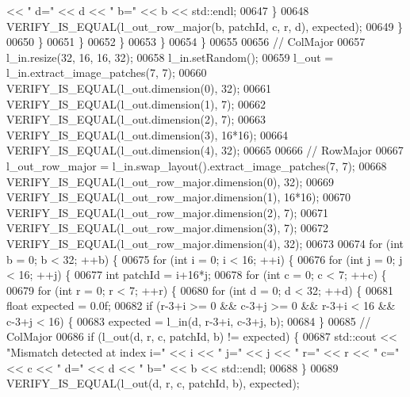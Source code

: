 \begin{DoxyCode}
       << \textcolor{stringliteral}{" d="} << d << \textcolor{stringliteral}{" b="} << b << std::endl;
00647               \}
00648               VERIFY\_IS\_EQUAL(l\_out\_row\_major(b, patchId, c, r, d), expected);
00649             \}
00650           \}
00651         \}
00652       \}
00653     \}
00654   \}
00655 
00656   \textcolor{comment}{// ColMajor}
00657   l\_in.resize(32, 16, 16, 32);
00658   l\_in.setRandom();
00659   l\_out = l\_in.extract\_image\_patches(7, 7);
00660   VERIFY\_IS\_EQUAL(l\_out.dimension(0), 32);
00661   VERIFY\_IS\_EQUAL(l\_out.dimension(1), 7);
00662   VERIFY\_IS\_EQUAL(l\_out.dimension(2), 7);
00663   VERIFY\_IS\_EQUAL(l\_out.dimension(3), 16*16);
00664   VERIFY\_IS\_EQUAL(l\_out.dimension(4), 32);
00665 
00666   \textcolor{comment}{// RowMajor}
00667   l\_out\_row\_major = l\_in.swap\_layout().extract\_image\_patches(7, 7);
00668   VERIFY\_IS\_EQUAL(l\_out\_row\_major.dimension(0), 32);
00669   VERIFY\_IS\_EQUAL(l\_out\_row\_major.dimension(1), 16*16);
00670   VERIFY\_IS\_EQUAL(l\_out\_row\_major.dimension(2), 7);
00671   VERIFY\_IS\_EQUAL(l\_out\_row\_major.dimension(3), 7);
00672   VERIFY\_IS\_EQUAL(l\_out\_row\_major.dimension(4), 32);
00673 
00674   \textcolor{keywordflow}{for} (\textcolor{keywordtype}{int} b = 0; b < 32; ++b) \{
00675     \textcolor{keywordflow}{for} (\textcolor{keywordtype}{int} i = 0; i < 16; ++i) \{
00676       \textcolor{keywordflow}{for} (\textcolor{keywordtype}{int} j = 0; j < 16; ++j) \{
00677         \textcolor{keywordtype}{int} patchId = i+16*j;
00678         \textcolor{keywordflow}{for} (\textcolor{keywordtype}{int} c = 0; c < 7; ++c) \{
00679           \textcolor{keywordflow}{for} (\textcolor{keywordtype}{int} r = 0; r < 7; ++r) \{
00680             \textcolor{keywordflow}{for} (\textcolor{keywordtype}{int} d = 0; d < 32; ++d) \{
00681               \textcolor{keywordtype}{float} expected = 0.0f;
00682               \textcolor{keywordflow}{if} (r-3+i >= 0 && c-3+j >= 0 && r-3+i < 16 && c-3+j < 16) \{
00683                 expected = l\_in(d, r-3+i, c-3+j, b);
00684               \}
00685               \textcolor{comment}{// ColMajor}
00686               \textcolor{keywordflow}{if} (l\_out(d, r, c, patchId, b) != expected) \{
00687                 std::cout << \textcolor{stringliteral}{"Mismatch detected at index i="} << i << \textcolor{stringliteral}{" j="} << j << \textcolor{stringliteral}{" r="} << r << \textcolor{stringliteral}{" c="} << c
       << \textcolor{stringliteral}{" d="} << d << \textcolor{stringliteral}{" b="} << b << std::endl;
00688               \}
00689               VERIFY\_IS\_EQUAL(l\_out(d, r, c, patchId, b), expected);

\end{DoxyCode}
